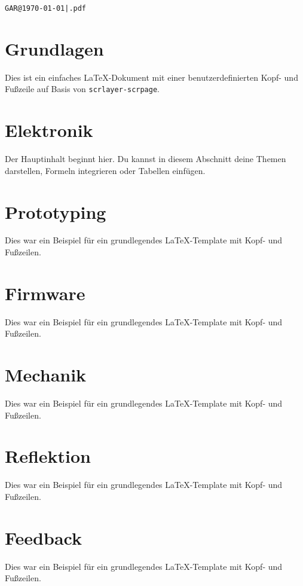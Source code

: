 \documentclass[a4paper,12pt]{scrartcl}
\begin{document}
\thispagestyle{empty}
\newpage

\tableofcontents

\thispagestyle{empty}
\newpage

\setcounter{page}{1}

\noindent\hfill\texttt{GAR@\today|\jobname.pdf}
\vspace{-25pt}

\section{Grundlagen}
Dies ist ein einfaches LaTeX-Dokument mit einer benutzerdefinierten Kopf- und Fußzeile auf Basis von \texttt{scrlayer-scrpage}.

\section{Elektronik}
Der Hauptinhalt beginnt hier. Du kannst in diesem Abschnitt deine Themen darstellen, Formeln integrieren oder Tabellen einfügen.

\section{Prototyping}
Dies war ein Beispiel für ein grundlegendes LaTeX-Template mit Kopf- und Fußzeilen.

\section{Firmware}
Dies war ein Beispiel für ein grundlegendes LaTeX-Template mit Kopf- und Fußzeilen.

\section{Mechanik}
Dies war ein Beispiel für ein grundlegendes LaTeX-Template mit Kopf- und Fußzeilen.

\section{Reflektion}
Dies war ein Beispiel für ein grundlegendes LaTeX-Template mit Kopf- und Fußzeilen.

\section{Feedback}
Dies war ein Beispiel für ein grundlegendes LaTeX-Template mit Kopf- und Fußzeilen.
\end{document}

